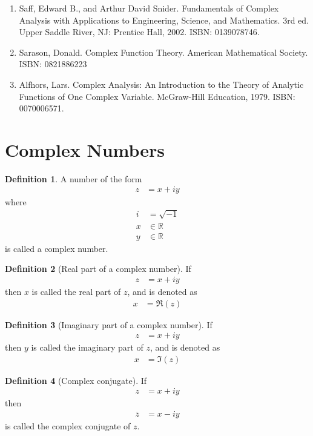 \documentclass[fleqn, a4paper, 12pt, twoside]{article}
\theoremstyle{definition}
\newtheorem{definition}{Definition}
\theoremstyle{theorem}
\begin{document}
\begin{enumerate}
	\item Saff, Edward B., and Arthur David Snider. Fundamentals of Complex Analysis with Applications to Engineering, Science, and Mathematics. 3rd ed. Upper Saddle River, NJ: Prentice Hall, 2002. ISBN: 0139078746.
	\item Sarason, Donald. Complex Function Theory. American Mathematical Society. ISBN: 0821886223
	\item Alfhors, Lars. Complex Analysis: An Introduction to the Theory of Analytic Functions of One Complex Variable. McGraw-Hill Education, 1979. ISBN: 0070006571.
\end{enumerate}

\newpage
\part{Complex Numbers}

\begin{definition}
	A number of the form
	\begin{align*}
		z & = x + i y
	\end{align*}
	where
	\begin{align*}
		i & = \sqrt{-1}    \\
		x & \in \mathbb{R} \\
		y & \in \mathbb{R}
	\end{align*}
	is called a complex number.
\end{definition}

\begin{definition}[Real part of a complex number]
	If
	\begin{align*}
		z & = x + i y
	\end{align*}
	then $x$ is called the real part of $z$, and is denoted as
	\begin{align*}
		x & = \Re(z)
	\end{align*}
\end{definition}

\begin{definition}[Imaginary part of a complex number]
	If
	\begin{align*}
		z & = x + i y
	\end{align*}
	then $y$ is called the imaginary part of $z$, and is denoted as
	\begin{align*}
		x & = \Im(z)
	\end{align*}
\end{definition}

\begin{definition}[Complex conjugate]
	If
	\begin{align*}
		z & = x + i y
	\end{align*}
	then
	\begin{align*}
		\overline{z} & = x - i y
	\end{align*}
	is called the complex conjugate of $z$.
\end{definition}
\end{document}
